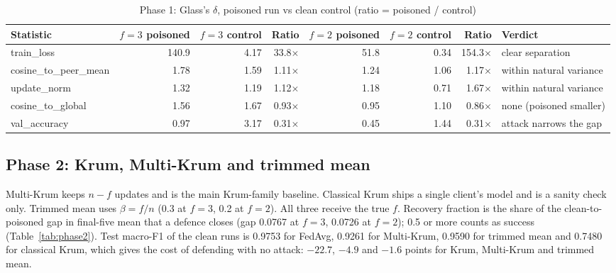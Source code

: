 \begin{table}[t]
\centering
\caption{Phase 1: Glass's $\delta$, poisoned run vs clean control (ratio = poisoned / control)}
\label{tab:phase1}
\footnotesize
\begin{tabular}{@{}lrrrrrrl@{}}
\toprule
Statistic & $f=3$ poisoned & $f=3$ control & Ratio & $f=2$ poisoned & $f=2$ control & Ratio & Verdict\\ %
\midrule
train\_loss & 140.9 & 4.17 & 33.8$\times$ & 51.8 & 0.34 & 154.3$\times$ & clear separation\\ %
cosine\_to\_peer\_mean & 1.78 & 1.59 & 1.11$\times$ & 1.24 & 1.06 & 1.17$\times$ & within natural variance\\ %
update\_norm & 1.32 & 1.19 & 1.12$\times$ & 1.18 & 0.71 & 1.67$\times$ & within natural variance\\ %
cosine\_to\_global & 1.56 & 1.67 & 0.93$\times$ & 0.95 & 1.10 & 0.86$\times$ & none (poisoned smaller)\\ %
val\_accuracy & 0.97 & 3.17 & 0.31$\times$ & 0.45 & 1.44 & 0.31$\times$ & attack narrows the gap\\ %
\bottomrule
\end{tabular}
\end{table}

\subsection{Phase 2: Krum, Multi-Krum and trimmed mean}
Multi-Krum keeps $n-f$ updates and is the main Krum-family baseline. Classical Krum
ships a single client's model and is a sanity check only. Trimmed mean uses
$\beta=f/n$ (0.3 at $f=3$, 0.2 at $f=2$). All three receive the true $f$. Recovery %
fraction is the share of the clean-to-poisoned gap in final-five mean that a defence
closes (gap 0.0767 at $f=3$, 0.0726 at $f=2$); 0.5 or more counts as success %
(Table~\ref{tab:phase2}). Test macro-F1 of the clean runs is 0.9753 for FedAvg, 0.9261 %
for Multi-Krum, 0.9590 for trimmed mean and 0.7480 for classical Krum, which gives the %
cost of defending with no attack: $-22.7$, $-4.9$ and $-1.6$ points for Krum, %
Multi-Krum and trimmed mean.

